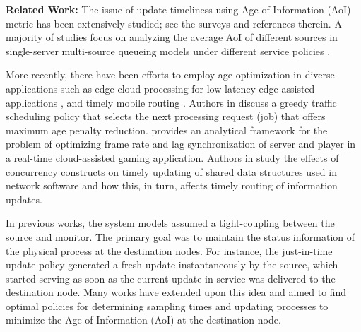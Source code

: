 \documentclass[conference, 10pt]{IEEEtran}
\begin{document}
\textbf{Related Work: }
The issue of update timeliness using Age of Information (AoI) metric has been extensively studied; see the surveys  \cite{kosta2017age,Yates-SBKMU-2021jsac-survey} and references therein. A majority of studies focus on analyzing the average AoI of different sources in single-server multi-source queueing models under different service policies \cite{moltafet-multi-source, Yates-Kaul-isit2012, Huang-Modiano-isit2015}. 

More recently, there have been efforts to employ age optimization in diverse applications such as edge cloud processing for low-latency edge-assisted applications \cite{Zhong-ZYGZ-aoi2019, Yates-THR-infocom2017}, and timely mobile routing \cite{ramani-cyINFOCOM, ramani-cy-AoI-INFOCOM}. 
Authors in \cite{Zhong-ZYGZ-aoi2019} discuss a greedy traffic scheduling policy that selects the next processing request (job) that offers maximum age penalty reduction. \cite{Yates-THR-infocom2017} provides an analytical framework for the problem of optimizing frame rate and lag synchronization of server and player in a real-time cloud-assisted gaming application. 
Authors in \cite{ramani-cyINFOCOM, ramani-cy-AoI-INFOCOM} study the effects of concurrency constructs on timely updating of shared data structures used in network software and how this, in turn, affects timely routing of information updates.


In previous works, the system models assumed a tight-coupling between the source and monitor. The primary goal was to maintain the status information of the physical process at the destination nodes. For instance, the just-in-time update policy \cite{Kaul-YG-infocom2012} generated a fresh update instantaneously by the source, which started serving as soon as the current update in service was delivered to the destination node. Many works \cite{Zhou-Saad-arxiv2018, Bedewy-SS-arxiv2017old, Yates-isit2015, Sun-UBYKS-IT2017UpdateorWait} have extended upon this idea and aimed to find optimal policies for determining sampling times and updating processes to minimize the Age of Information (AoI) at the destination node.
\end{document}
